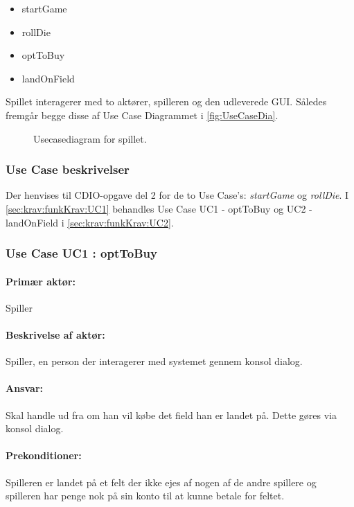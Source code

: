 \begin{itemize}
\item startGame
\item rollDie
\item optToBuy
\item landOnField
\end{itemize}

Spillet interagerer med to aktører, spilleren og den udleverede GUI. Således fremgår begge disse af Use Case Diagrammet i \vref{fig:UseCaseDia}.

\begin{figure}
\caption{Usecasediagram for spillet.}\label{fig:UseCaseDia}
\centering

\end{figure}

\subsubsection{Use Case beskrivelser}\label{sec:krav:funkKrav:useCaseBeskriv}
Der henvises til CDIO-opgave del 2 for de to Use Case's: \textit{startGame} og \textit{rollDie}. I \vref{sec:krav:funkKrav:UC1} behandles Use Case UC1 - optToBuy og UC2 - landOnField i \vref{sec:krav:funkKrav:UC2}.

\subsubsection{Use Case UC1 : optToBuy}\label{sec:krav:funkKrav:UC1}

\paragraph{Primær aktør:} 
Spiller

\paragraph{Beskrivelse af aktør:} 
Spiller, en person der interagerer med systemet gennem konsol dialog.

\paragraph{Ansvar:} 
Skal handle ud fra om han vil købe det field han er landet på. Dette gøres via konsol dialog.
 
\paragraph{Prekonditioner:} 
Spilleren er landet på et felt der ikke ejes af nogen af de andre spillere og spilleren har penge nok på sin konto til at kunne betale for feltet.


